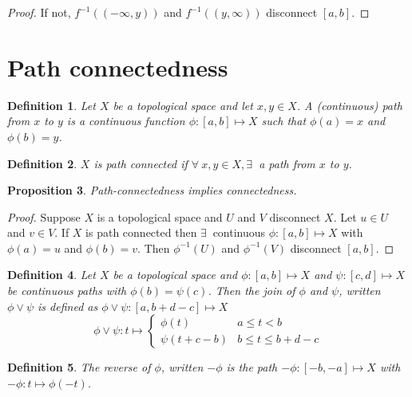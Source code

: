 \documentclass{notes}
\theoremstyle{plain}
\newtheorem{proposition}{Proposition}[chapter]
\newtheorem{definition}[proposition]{Definition}
\begin{document}
\begin{proof}
If not, $f^{-1}((-\infty,y))$ and $f^{-1}((y,\infty))$ disconnect $[a,b]$.
\end{proof}

\section{Path connectedness}

\begin{definition}
Let $X$ be a topological space and let $x, y \in X$.  A (continuous) path%
from $x$ to $y$ is a continuous function $\phi \colon [a,b] \mapsto X$ such that
$\phi(a) = x$ and $\phi(b) = y$.
\end{definition}

\begin{definition}
$X$ is path connected
if $\forall\ x,y \in X, \exists\ $ a path from $x$ to $y$.
\end{definition}

\begin{proposition}
Path-connectedness implies connectedness.
\end{proposition}

\begin{proof}
Suppose $X$ is a topological space and $U$ and $V$ disconnect $X$.  Let
$u \in U$ and $v \in V$.  If $X$ is path connected then $\exists\ $ 
continuous $\phi \colon [a,b] \mapsto X$ with $\phi(a)=u$ and $\phi(b)=v$.
Then $\phi^{-1}(U)$ and $\phi^{-1}(V)$ disconnect $[a,b]$.
\end{proof}

\begin{definition}
Let $X$ be a topological space and $\phi \colon [a,b] \mapsto X$ and $\psi :
[c,d] \mapsto X$ be continuous paths with $\phi(b) = \psi(c)$.  Then the
join of $\phi$ and $\psi$, written $\phi \vee \psi$ is defined as
$\phi \vee \psi \colon [a,b+d-c] \mapsto X$
\[
\phi \vee \psi \colon t \mapsto
\begin{cases}
\phi(t) & a \le t < b \\
\psi(t+c-b) & b \le t \le b+d-c
\end{cases}
\]
\end{definition}

\begin{definition}
The reverse of $\phi$, written $-\phi$ is the path
$-\phi \colon [-b,-a] \mapsto X$ with $-\phi \colon t \mapsto \phi(-t)$.
\end{definition}
\end{document}

